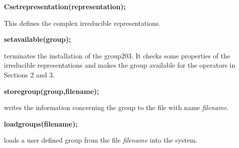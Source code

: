 {\bf Csetrepresentation(representation);}

This defines the complex irreducible representations.

{\bf setavailable(group);}

terminates the installation of the group203. It checks some properties of the
irreducible representations and makes the group available for the
operators in Sections 2 and 3.

{\bf storegroup(group,filename);}

writes the information concerning the group to the file with name
{\em filename}.

{\bf loadgroups(filename);}

loads a user defined group from the file {\em filename} into
the system.
